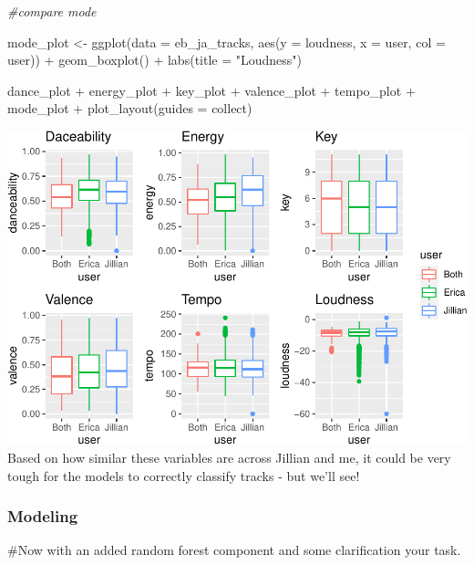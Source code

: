\documentclass[
]{article}
\newenvironment{Shaded}{\begin{snugshade}}{\end{snugshade}}
\newcommand{\AttributeTok}[1]{\textcolor[rgb]{0.77,0.63,0.00}{#1}}
\newcommand{\CommentTok}[1]{\textcolor[rgb]{0.56,0.35,0.01}{\textit{#1}}}
\newcommand{\FunctionTok}[1]{\textcolor[rgb]{0.00,0.00,0.00}{#1}}
\newcommand{\NormalTok}[1]{#1}
\newcommand{\OtherTok}[1]{\textcolor[rgb]{0.56,0.35,0.01}{#1}}
\newcommand{\SpecialCharTok}[1]{\textcolor[rgb]{0.00,0.00,0.00}{#1}}
\newcommand{\StringTok}[1]{\textcolor[rgb]{0.31,0.60,0.02}{#1}}
\begin{document}
\begin{Shaded}
\begin{Highlighting}[]
\CommentTok{\#compare mode}

\NormalTok{mode\_plot }\OtherTok{\textless{}{-}} \FunctionTok{ggplot}\NormalTok{(}\AttributeTok{data =}\NormalTok{ eb\_ja\_tracks,}
       \FunctionTok{aes}\NormalTok{(}\AttributeTok{y =}\NormalTok{ loudness,}
           \AttributeTok{x =}\NormalTok{ user,}
           \AttributeTok{col =}\NormalTok{ user)) }\SpecialCharTok{+}
  \FunctionTok{geom\_boxplot}\NormalTok{() }\SpecialCharTok{+}
  \FunctionTok{labs}\NormalTok{(}\AttributeTok{title =} \StringTok{"Loudness"}\NormalTok{)}

\NormalTok{dance\_plot }\SpecialCharTok{+}\NormalTok{ energy\_plot }\SpecialCharTok{+}\NormalTok{ key\_plot }\SpecialCharTok{+}\NormalTok{ valence\_plot }\SpecialCharTok{+}\NormalTok{ tempo\_plot }\SpecialCharTok{+}\NormalTok{ mode\_plot }\SpecialCharTok{+}
  \FunctionTok{plot\_layout}\NormalTok{(}\AttributeTok{guides =} \StringTok{\textquotesingle{}collect\textquotesingle{}}\NormalTok{)}
\end{Highlighting}
\end{Shaded}

\includegraphics{lab5_files/figure-latex/unnamed-chunk-4-1.pdf} Based on
how similar these variables are across Jillian and me, it could be very
tough for the models to correctly classify tracks - but we'll see!

\hypertarget{modeling}{%
\subsubsection{\texorpdfstring{\textbf{Modeling}}{Modeling}}\label{modeling}}

\#Now with an added random forest component and some clarification your
task.
\end{document}

